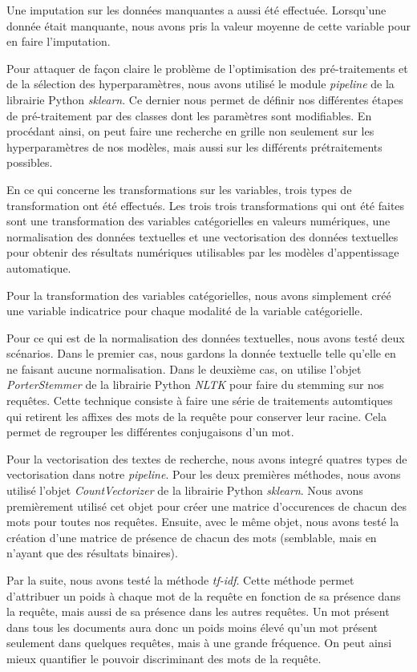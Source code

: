 Une imputation sur les données manquantes a aussi été effectuée. Lorsqu'une donnée était manquante, nous avons pris la valeur moyenne de cette variable pour en faire l'imputation.

Pour attaquer de façon claire le problème de l'optimisation des pré-traitements et de la sélection des hyperparamètres, nous avons utilisé le module \emph{pipeline} de la librairie Python \emph{sklearn}. Ce dernier nous permet de définir nos différentes étapes de pré-traitement par des classes dont les paramètres sont modifiables. En procédant ainsi, on peut faire une recherche en grille non seulement sur les hyperparamètres de nos modèles, mais aussi sur les différents prétraitements possibles.
\break

En ce qui concerne les transformations sur les variables, trois types de transformation ont été effectués.
Les trois trois transformations qui ont été faites sont une transformation des variables catégorielles en valeurs numériques, une normalisation des données textuelles et une vectorisation des données textuelles pour obtenir des résultats numériques utilisables par les modèles d'appentissage automatique.

Pour la transformation des variables catégorielles, nous avons simplement créé une variable indicatrice pour chaque modalité de la variable catégorielle.

Pour ce qui est de la normalisation des données textuelles, nous avons testé deux scénarios.
Dans le premier cas, nous gardons la donnée textuelle telle qu'elle en ne faisant aucune normalisation.
Dans le deuxième cas, on utilise l'objet \emph{PorterStemmer} de la librairie Python \emph{NLTK} pour faire du stemming sur nos requêtes.
Cette technique consiste à faire une série de traitements automtiques qui retirent les affixes des mots de la requête pour conserver leur racine. 
Cela permet de regrouper les différentes conjugaisons d'un mot.

Pour la vectorisation des textes de recherche, nous avons integré quatres types de vectorisation dans notre \textit{pipeline}.
Pour les deux premières méthodes, nous avons utilisé l'objet \textit{CountVectorizer} de la librairie Python \textit{sklearn}. 
Nous avons premièrement utilisé cet objet pour créer une matrice d'occurences de chacun des mots pour toutes nos requêtes.
Ensuite, avec le même objet, nous avons testé la création d'une matrice de présence de chacun des mots (semblable, mais en n'ayant que des résultats binaires).

Par la suite, nous avons testé la méthode \textit{tf-idf}. 
Cette méthode permet d'attribuer un poids à chaque mot de la requête en fonction de sa présence dans la requête, mais aussi de sa présence dans les autres requêtes. Un mot présent dans tous les documents aura donc un poids moins élevé qu'un mot présent seulement dans quelques requêtes, mais à une grande fréquence. On peut ainsi mieux quantifier le pouvoir discriminant des mots de la requête.

